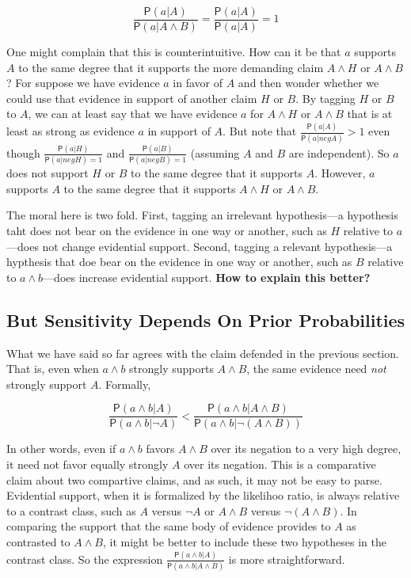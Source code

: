 \documentclass[10pt,dvipsnames,enabledeprecatedfontcommands]{scrartcl}
\newcommand{\pr}[1]{\mathsf{P}(#1)}
\begin{document}
\[\frac{\pr{a\vert A}}{\pr{a \vert A \wedge B}}=\frac{\pr{a \vert A}}{\pr{a \vert A}}=1\]

One might complain that this is counterintuitive. How can it be that
\(a\) supports \(A\) to the same degree that it supports the more
demanding claim \(A\wedge H\) or \(A\wedge B\)? For suppose we have
evidence \(a\) in favor of \(A\) and then wonder whether we could use
that evidence in support of another claim \(H\) or \(B\). By tagging
\(H\) or \(B\) to \(A\), we can at least say that we have evidence \(a\)
for \(A\wedge H\) or \(A\wedge B\) that is at least as strong as
evidence \(a\) in support of \(A\). But note that
\(\frac{\pr{a \vert A}}{\pr{a\vert neg A}}>1\) even though
\(\frac{\pr{a \vert H}}{\pr{a\vert neg H}=1}\) and
\(\frac{\pr{a \vert B}}{\pr{a\vert neg B}=1}\) (assuming \(A\) and \(B\)
are independent). So \(a\) does not support \(H\) or \(B\) to the same
degree that it supports \(A\). However, \(a\) supports \(A\) to the same
degree that it supports \(A\wedge H\) or \(A\wedge B\).

The moral here is two fold. First, tagging an irrelevant hypothesis---a
hypothesis taht does not bear on the evidence in one way or another,
such as \(H\) relative to \(a\)---does not change evidential support.
Second, tagging a relevant hypothesis---a hypthesis that doe bear on the
evidence in one way or another, such as \(B\) relative to
\(a\wedge b\)---does increase evidential support.
\textbf{How to explain this better?}

\hypertarget{but-sensitivity-depends-on-prior-probabilities}{%
\subsection{But Sensitivity Depends On Prior
Probabilities}\label{but-sensitivity-depends-on-prior-probabilities}}

What we have said so far agrees with the claim defended in the previous
section. That is, even when \(a\wedge b\) strongly supports
\(A \wedge B\), the same evidence need \textit{not} strongly support
\(A\). Formally,

\[\frac{\pr{a\wedge b \vert A}}{\pr{a\wedge b \vert \neg A}} < \frac{\pr{a\wedge b \vert A \wedge B}}{\pr{a\wedge b \vert \neg (A \wedge B)}}\]

\noindent In other words, even if \(a\wedge b\) favors \(A\wedge B\)
over its negation to a very high degree, it need not favor equally
strongly \(A\) over its negation. This is a comparative claim about two
compartive claims, and as such, it may not be easy to parse. Evidential
support, when it is formalized by the likelihoo ratio, is always
relative to a contrast class, such as \(A\) versus \(\neg A\) or
\(A\wedge B\) versus \(\neg (A\wedge B)\). In comparing the support that
the same body of evidence provides to \(A\) as contrasted to
\(A\wedge B\), it might be better to include these two hypotheses in the
contrast class. So the expression
\(\frac{\pr{a\wedge b \vert A}}{\pr{a\wedge b \vert A \wedge B}}\) is
more straightforward.
\end{document}
